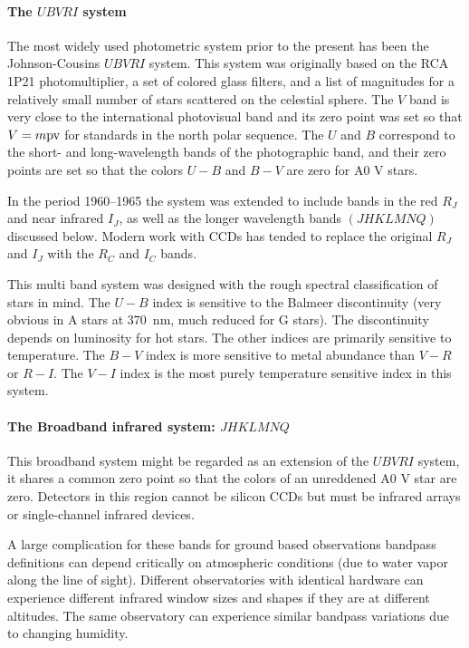 \documentclass{article}
\begin{document}
\paragraph{The $UBVRI$ system} The most widely used photometric system
prior to the present has been the Johnson-Cousins $UBVRI$ system. This
system was originally based on the RCA 1P21 photomultiplier, a set of
colored glass filters, and a list of magnitudes for a relatively small
number of stars scattered on the celestial sphere. The $V$ band is very
close to the international photovisual band and its zero point was set
so that $V=m{\rm pv}$ for standards in the north polar sequence. The $U$
and $B$ correspond to the short- and long-wavelength bands of the
photographic band, and their zero points are set so that the colors
$U-B$ and $B-V$ are zero for A0 V stars. 

In the period 1960--1965 the system was extended to include bands in
the red $R_J$ and near infrared $I_J$, as well as the longer
wavelength bands $(JHKLMNQ)$ discussed below. Modern work with CCDs
has tended to replace the original $R_J$ and $I_J$ with the $R_C$ and
$I_C$ bands. 

This multi band system was designed with the rough spectral
classification of stars in mind. The $U-B$ index is sensitive to the
Balmeer discontinuity (very obvious in A stars at 370~nm, much reduced
for G stars). The discontinuity  depends on luminosity for hot
stars. The other indices are primarily sensitive to temperature. The
$B-V$ index is more sensitive to metal abundance than $V-R$ or
$R-I$. The $V-I$ index is the most purely temperature sensitive index
in this system. 
\paragraph{The Broadband infrared system: $JHKLMNQ$} This broadband
system might be regarded as an extension of the $UBVRI$ system, it
shares a common zero point so that the colors of an unreddened A0 V
star are zero. Detectors in this region cannot be silicon CCDs but
must be infrared arrays or single-channel infrared devices. 

A large complication for these bands for ground based observations
bandpass definitions can depend critically on atmospheric conditions
(due to water vapor along the line of sight). Different observatories
with identical hardware can experience different infrared window sizes
and shapes if they are at different altitudes. The same observatory
can experience similar bandpass variations due to changing humidity. 
\end{document}
